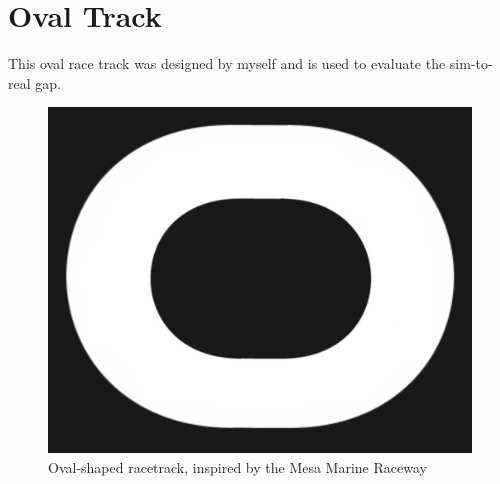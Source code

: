 \section{Oval Track}
This oval race track was designed by myself and is used to evaluate the sim-to-real gap.
\begin{figure}[H]
\centering
\includegraphics[scale=0.3]{Figures/round.png}
\caption{Oval-shaped racetrack, inspired by the Mesa Marine Raceway}
\label{oval}
\end{figure}